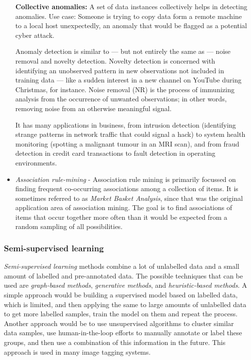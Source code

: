 \documentclass[12pt,a4paper]{article}
\begin{document}
\begin{itemize}
    \textbf{Collective anomalies:} A set of data instances collectively helps in detecting anomalies. Use case: Someone is trying to copy data form a remote machine to a local host unexpectedly, an anomaly that would be flagged as a potential cyber attack. 

    Anomaly detection is similar to — but not entirely the same as — noise removal and novelty detection. Novelty detection is concerned with identifying an unobserved pattern in new observations not included in training data — like a sudden interest in a new channel on YouTube during Christmas, for instance. Noise removal (NR) is the process of immunizing analysis from the occurrence of unwanted observations; in other words, removing noise from an otherwise meaningful signal. 

    It has many applications in business, from intrusion detection (identifying strange patterns in network traffic that could signal a hack) to system health monitoring (spotting a malignant tumour in an MRI scan), and from fraud detection in credit card transactions to fault detection in operating environments.
    \item \textit{Association rule-mining} - Association rule mining is primarily focussed on finding frequent co-occurring associations among a collection of items. It is sometimes referred to as \textit{Market Basket Analysis}, since that was the original application area of association mining. The goal is to find associations of items that occur together more often than it would be expected from a random sampling of all possibilities.
\end{itemize}

\subsubsection{Semi-supervised learning}
\textit{Semi-supervised learning} methods combine a lot of unlabelled data and a small amount of labelled and pre-annotated data. The possible techniques that can be used are \textit{graph-based methods}, \textit{generative methods}, and \textit{heuristic-based methods}. 
A simple approach would be building a supervised model based on labelled data, which is limited, and
then applying the same to large amounts of unlabelled data to get more labelled samples, train the model on them and repeat the process. Another approach would be to use unsupervised algorithms to cluster similar data samples, use human-in-the-loop efforts to manually annotate or label these groups, and then use a combination of this information in the future. This approach is used in many image tagging systems. 
\end{document}
